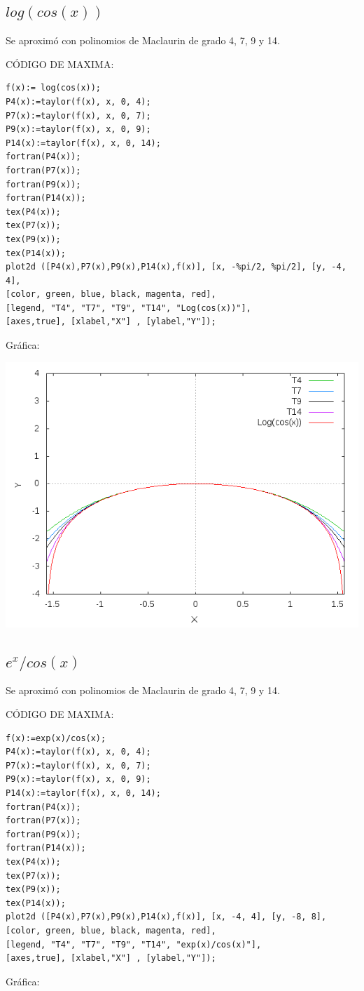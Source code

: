 \documentclass[notitlepage,12pt]{article}
\begin{document}
\subsection{$log(cos(x))$}
Se aproxim\'o con polinomios de Maclaurin de grado 4, 7, 9 y 14.

C\'ODIGO DE MAXIMA:
\begin{verbatim}
f(x):= log(cos(x));
P4(x):=taylor(f(x), x, 0, 4);
P7(x):=taylor(f(x), x, 0, 7);
P9(x):=taylor(f(x), x, 0, 9);
P14(x):=taylor(f(x), x, 0, 14);
fortran(P4(x));
fortran(P7(x));
fortran(P9(x));
fortran(P14(x));
tex(P4(x));
tex(P7(x));
tex(P9(x));
tex(P14(x));
plot2d ([P4(x),P7(x),P9(x),P14(x),f(x)], [x, -%pi/2, %pi/2], [y, -4, 4],
[color, green, blue, black, magenta, red],
[legend, "T4", "T7", "T9", "T14", "Log(cos(x))"],
[axes,true], [xlabel,"X"] , [ylabel,"Y"]);
\end{verbatim}
Gr\'afica:


\includegraphics[scale=0.5]{log(cosx)_ptaylor}

\subsection{$e^x/cos(x)$}
Se aproxim\'o con polinomios de Maclaurin de grado 4, 7, 9 y 14.

C\'ODIGO DE MAXIMA:
\begin{verbatim}
f(x):=exp(x)/cos(x);
P4(x):=taylor(f(x), x, 0, 4);
P7(x):=taylor(f(x), x, 0, 7);
P9(x):=taylor(f(x), x, 0, 9);
P14(x):=taylor(f(x), x, 0, 14);
fortran(P4(x));
fortran(P7(x));
fortran(P9(x));
fortran(P14(x));
tex(P4(x));
tex(P7(x));
tex(P9(x));
tex(P14(x));
plot2d ([P4(x),P7(x),P9(x),P14(x),f(x)], [x, -4, 4], [y, -8, 8],
[color, green, blue, black, magenta, red],
[legend, "T4", "T7", "T9", "T14", "exp(x)/cos(x)"],
[axes,true], [xlabel,"X"] , [ylabel,"Y"]);
\end{verbatim}
Gr\'afica:
\end{document}
